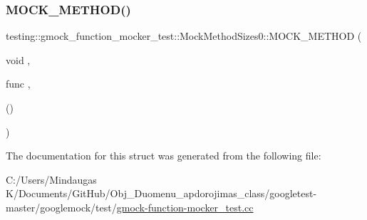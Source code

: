 \mbox{\label{structtesting_1_1gmock__function__mocker__test_1_1_mock_method_sizes0_ab38f39ad908e506f699b3cd8c1b9a218}} 
\subsubsection{\texorpdfstring{MOCK\_METHOD()}{MOCK\_METHOD()}\hspace{0.1cm}{\footnotesize\ttfamily [2/2]}}
{\footnotesize\ttfamily testing\+::gmock\+\_\+function\+\_\+mocker\+\_\+test\+::\+Mock\+Method\+Sizes0\+::\+M\+O\+C\+K\+\_\+\+M\+E\+T\+H\+OD (\begin{DoxyParamCaption}\item[{void}]{,  }\item[{func}]{,  }\item[{()}]{ }\end{DoxyParamCaption})}



The documentation for this struct was generated from the following file\+:\begin{DoxyCompactItemize}
\item 
C\+:/\+Users/\+Mindaugas K/\+Documents/\+Git\+Hub/\+Obj\+\_\+\+Duomenu\+\_\+apdorojimas\+\_\+class/googletest-\/master/googlemock/test/\mbox{\hyperlink{googletest-master_2googlemock_2test_2gmock-function-mocker__test_8cc}{gmock-\/function-\/mocker\+\_\+test.\+cc}}\end{DoxyCompactItemize}
